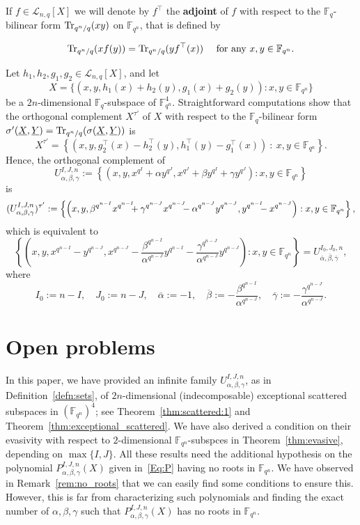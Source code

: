 If $f\in\mathcal{L}_{n,q}[X]$ we will denote by $f^\top$ the  \textbf{adjoint} of $f$ with
respect to the $\mathbb{F}_q$-bilinear form ${\rm Tr}_{q^n/q}(xy)$ on ${\mathbb F}_{q^n}$, that is defined by

$${\rm Tr}_{q^n/q}(xf(y))={\rm Tr}_{q^n/q}(yf^\top(x)) \quad \mbox{ for any } x,y \in {\mathbb F}_{q^n}.$$

Let $h_1,h_2,g_1,g_2\in \mathcal{L}_{n,q}[X]$, and let 
$$X=\{\left(x,y,h_1(x)+h_2(y),g_1(x)+g_2(y)\right) : x,y\in\mathbb{F}_{q^n}\}$$
be a $2n$-dimensional $\mathbb{F}_q$-subspace of ${\mathbb F}_{q^n}^4$. Straightforward computations show that the orthogonal complement $X^{\tau'}$ of $X$ with respect to the
$\mathbb{F}_q$-bilinear form $\sigma'(\underline{X},\underline{Y})={\rm Tr}_{q^n/q}(\sigma(\underline{X},\underline{Y}))$ is \[X^{\tau'}=\left\{\left(x,y,g_2^\top(x)-h_2^\top(y),h_1^\top(y)-g_1^\top(x)\right) \ : \ x,y\in\mathbb{F}_{q^n}\right\}.\]
Hence, the orthogonal complement of
$$        U_{\alpha, \beta, \gamma}^{I,J,n}:=\left\{\left(x,y,x^{q^I}+\alpha y^{q^J},x^{q^J}+\beta y^{q^I} + \gamma y^{q^J}\right)  : x,y\in \mathbb{F}_{q^n}\right\} $$
is
{\small $$
        (U_{\alpha, \beta, \gamma}^{I,J,n}) ^{\tau'}:=\left\{\left(x,y,\beta^{q^{n-I}}x^{q^{n-I}} \hspace{-0.2cm} +\gamma ^{q^{n-J}}x^{q^{n-J}} \hspace{-0.2cm} -\alpha ^{q^{n-J}}y^{q^{n-J}},y^{q^{n-I}} \hspace{-0.2cm} -x^{q^{n-J}}\right) :  x,y\in \mathbb{F}_{q^n}\right\},
$$}
which is equivalent to 
{\small $$       \left\{\left(x,y,x^{q^{n-I}}-y^{q^{n-J}},x^{q^{n-J}}- \frac{\beta^{q^{n-I}}}{\alpha ^{q^{n-J}}}y^{q^{n-I}}-\frac{\gamma ^{q^{n-J}}}{\alpha ^{q^{n-J}}}y^{q^{n-J}}\right) :  x,y\in \mathbb{F}_{q^n}\right\}=U_{\overline{\alpha}, \overline{\beta}, \overline{\gamma}}^{I_0,J_0,n}, $$}
where 
$$ I_0:=n-I, \quad J_0:=n-J, \quad \overline{\alpha}:=-1, \quad \overline{\beta}:=-\frac{\beta^{q^{n-I}}}{\alpha ^{q^{n-J}}}, \quad \overline{\gamma}:=-\frac{\gamma ^{q^{n-J}}}{\alpha ^{q^{n-J}}}.$$

\section{Open problems}\label{sec:conclusions}

In this paper, we have provided an infinite family $U_{\alpha, \beta, \gamma}^{I,J,n}$, as in Definition~\ref{defn:sets}, of $2n$-dimensional (indecomposable) exceptional scattered subspaces in $(\mathbb{F}_{q^n})^{4}$; see Theorem~\ref{thm:scattered:1} and Theorem~\ref{thm:exceptional_scattered}. We have also derived a condition on their evasivity with respect to $2$-dimensional ${\mathbb F}_{q^n}$-subspces in Theorem~\ref{thm:evasive}, depending on $\max\{I,J\}$. All these results need the additional hypothesis on the polynomial $P_{\alpha, \beta, \gamma}^{I,J,n}(X)$ given in~\eqref{Eq:P} having no roots in ${\mathbb F}_{q^n}$. We have observed in Remark~\ref{rem:no_roots} that we can easily find some conditions to ensure this. However, this is far from characterizing such polynomials and finding the exact number of $\alpha,\beta,\gamma$ such that $P_{\alpha, \beta, \gamma}^{I,J,n}(X)$ has no roots in ${\mathbb F}_{q^n}$. 

